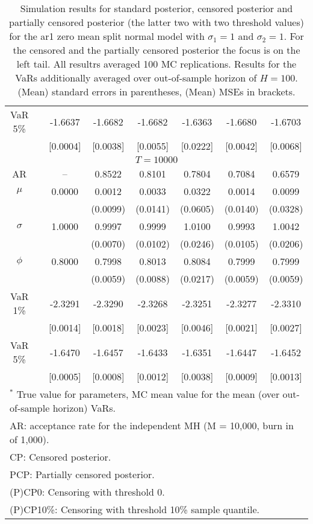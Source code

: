 {\begin{table}
\begin{tabular}{cc cccccc}
VaR 5\% && -1.6637 & -1.6682 & -1.6682 & -1.6363 & -1.6680 & -1.6703 \\ 
 && [0.0004] & [0.0038] & [0.0055] & [0.0222] & [0.0042] & [0.0068] \\ 
\hline 
\multicolumn{8}{c}{$T =10000$}  \\ 
\hline 
AR && -- & 0.8522 & 0.8101 & 0.7804 & 0.7084 & 0.6579 \\  
$\mu$&& 0.0000 & 0.0012 & 0.0033 & 0.0322 & 0.0014 & 0.0099 \\ 
&&   & (0.0099) & (0.0141) & (0.0605) & (0.0140) & (0.0328) \\ 
$\sigma$&& 1.0000 & 0.9997 & 0.9999 & 1.0100 & 0.9993 & 1.0042 \\ 
&&   & (0.0070) & (0.0102) & (0.0246) & (0.0105) & (0.0206) \\ 
$\phi$&& 0.8000 & 0.7998 & 0.8013 & 0.8084 & 0.7999 & 0.7999 \\ 
&&   & (0.0059) & (0.0088) & (0.0217) & (0.0059) & (0.0059) \\ 
VaR 1\% && -2.3291 & -2.3290 & -2.3268 & -2.3251 & -2.3277 & -2.3310 \\ 
  && [0.0014] & [0.0018] & [0.0023] & [0.0046] & [0.0021] & [0.0027] \\ 
VaR 5\% && -1.6470 & -1.6457 & -1.6433 & -1.6351 & -1.6447 & -1.6452 \\ 
 && [0.0005] & [0.0008] & [0.0012] & [0.0038] & [0.0009] & [0.0013] \\ 
\hline 
\multicolumn{8}{l}{\footnotesize{$^*$ True value for parameters, MC mean value for the mean (over out-of-sample horizon) VaRs.}}  \\ 
\multicolumn{8}{l}{\footnotesize{AR: acceptance rate for the independent MH (M = 10,000, burn in of 1,000).}}  \\ 
\multicolumn{8}{l}{\footnotesize{CP: Censored posterior.}}  \\ 
\multicolumn{8}{l}{\footnotesize{PCP: Partially censored posterior.}} \\ 
\multicolumn{8}{l}{\footnotesize{(P)CP0: Censoring with threshold 0.}} \\ 
\multicolumn{8}{l}{\footnotesize{(P)CP10\%: Censoring with threshold 10\% sample quantile.}}  \\ 
\end{tabular}
 \caption{Simulation results for standard posterior, censored posterior and partially censored posterior (the latter two with two threshold values) for the ar1 zero mean split normal model with $\sigma_{1} = 1$ and $\sigma_{2} = 1$. For the censored and the partially censored posterior the focus is on the left tail. All resultrs averaged 100 MC replications. Results for the VaRs additionally averaged over out-of-sample horizon of $H=100$. (Mean) standard errors in parentheses, (Mean) MSEs in brackets.} 
\label{tab:ar1_pcp}  
\end{table}
}